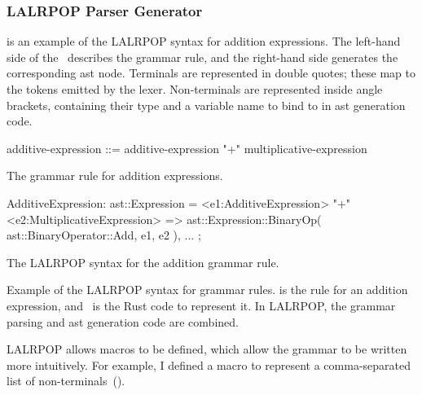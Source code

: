 \documentclass[00-main.tex]{subfiles}
\begin{document}
\subsubsection{LALRPOP Parser Generator}

 is an example of the LALRPOP syntax for addition expressions.
The left-hand side of the~\RustInline{=>} describes the grammar rule, and the right-hand side generates the corresponding \gls{ast} node.
Terminals are represented in double quotes; these map to the tokens emitted by the lexer.
Non-terminals are represented inside angle brackets, containing their type and a variable name to bind to in \gls{ast} generation code.

\begin{listing}[t]
  \begin{sublisting}[t]{\textwidth}
    \begin{GrammarListing}
      additive-expression ::= additive-expression "+" multiplicative-expression
    \end{GrammarListing}
    \caption{The grammar rule for addition expressions.}
    \label{sublst:addition expr grammar rule}
  \end{sublisting}
  \par\medskip %
  \begin{sublisting}[t]{\textwidth}
    \begin{RustListing}
      AdditiveExpression: ast::Expression = {
          <e1:AdditiveExpression> "+" <e2:MultiplicativeExpression>
              => ast::Expression::BinaryOp(
                  ast::BinaryOperator::Add,
                  e1,
                  e2
              ),
          ...
      };
    \end{RustListing}
    \caption{The LALRPOP syntax for the addition grammar rule.}
    \label{sublst:lalrpop syntax addition rule}
  \end{sublisting}
  \caption{
    Example of the LALRPOP syntax for grammar rules.
     is the rule for an addition expression, and~ is the Rust code to represent it.
    In LALRPOP, the grammar parsing and \gls{ast} generation code are combined.
  }
  \label{lst:AST generation code example}
\end{listing}

LALRPOP allows macros to be defined, which allow the grammar to be written more intuitively.
For example, I defined a macro to represent a comma-separated list of non-terminals~().
\end{document}
